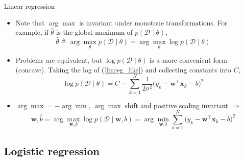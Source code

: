 \documentclass{beamer}
\numberwithin{equation}{section}
\newcommand{\aref}[1]{\alert{\ref{#1}}}
\begin{document}
\begin{frame}{Linear regression}
    \begin{itemize}
        \item
        Note that $ \arg\max $ is invariant under monotone transformations. For
        example, if $ \hat{\theta} $ is the global maximum of
        $ p(\mathcal{D} \mid \theta) $,
        \begin{equation*}
            \hat{\theta} \triangleq \arg\max_\theta p(\mathcal{D} \mid \theta)
            = \arg\max_\theta \log p(\mathcal{D} \mid \theta)
        \end{equation*}

        \item
        Problems are equivalent, but $ \log p(\mathcal{D} \mid \theta) $ is a
        more convenient form (concave). Taking the log of (\aref{linreg_like})
        and collecting constants into $ C $,
        \begin{equation} \label{linreg_loglike}
            \log p(\mathcal{D} \mid \theta) = C - \sum_{k = 1}^N
                \frac{1}{2\sigma^2}\big(
                    y_k - \mathbf{w}^\top\mathbf{x}_k - b
                \big)^2
        \end{equation}

        \item
        $ \arg\max = -\arg\min $, $ \arg\max $ shift and positive scaling
        invariant $ \Rightarrow $
        \begin{equation} \label{linreg_like2cost}
            \hat{\mathbf{w}}, \hat{b} =
            \arg\max_{\mathbf{w}, b}\log p(\mathcal{D} \mid \mathbf{w}, b) =
            \arg\min_{\mathbf{w}, b}\sum_{k = 1}^N\big(
                y_k - \mathbf{w}^\top\mathbf{x}_k - b
            \big)^2
        \end{equation}
    \end{itemize}
\end{frame}

\subsection{Logistic regression}
\end{document}
